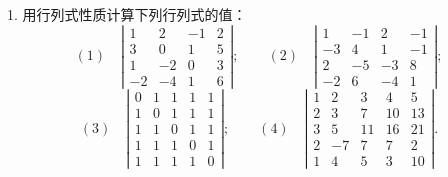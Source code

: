 \documentclass[UTF8,12pt,a4paper,fontset=fandol]{ctexart}
\begin{document}
1. 用行列式性质计算下列行列式的值：
\[
(1)\quad
\left|\begin{array}{rrrr}
1 & 2 & -1 & 2\\
3 & 0 & 1 & 5\\
1 & -2 & 0 & 3\\
-2 & -4 & 1 & 6
\end{array}\right|;
\qquad
(2)\quad
\left|\begin{array}{rrrr}
1 & -1 & 2 & -1\\
-3 & 4 & 1 & -1\\
2 & -5 & -3 & 8\\
-2 & 6 & -4 & 1
\end{array}\right|;
\]
\[
(3)\quad
\left|\begin{array}{rrrrr}
0 & 1 & 1 & 1 & 1\\
1 & 0 & 1 & 1 & 1\\
1 & 1 & 0 & 1 & 1\\
1 & 1 & 1 & 0 & 1\\
1 & 1 & 1 & 1 & 0
\end{array}\right|;
\qquad
(4)\quad
\left|\begin{array}{rrrrr}
1 & 2 & 3 & 4 & 5\\
2 & 3 & 7 & 10 & 13\\
3 & 5 & 11 & 16 & 21\\
2 & -7 & 7 & 7 & 2\\
1 & 4 & 5 & 3 & 10
\end{array}\right|.
\]
\end{document}
